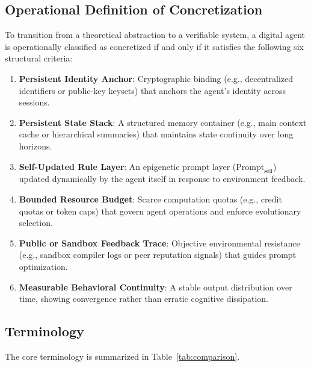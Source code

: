 \documentclass[10pt,journal,compsoc]{IEEEtran}
\begin{document}
\subsection{Operational Definition of Concretization}
To transition from a theoretical abstraction to a verifiable system, a digital agent is operationally classified as concretized if and only if it satisfies the following six structural criteria:
\begin{enumerate}
    \item \textbf{Persistent Identity Anchor}: Cryptographic binding (e.g., decentralized identifiers or public-key keysets) that anchors the agent's identity across sessions.
    \item \textbf{Persistent State Stack}: A structured memory container (e.g., main context cache or hierarchical summaries) that maintains state continuity over long horizons.
    \item \textbf{Self-Updated Rule Layer}: An epigenetic prompt layer ($\text{Prompt}_{\text{self}}$) updated dynamically by the agent itself in response to environment feedback.
    \item \textbf{Bounded Resource Budget}: Scarce computation quotas (e.g., credit quotas or token caps) that govern agent operations and enforce evolutionary selection.
    \item \textbf{Public or Sandbox Feedback Trace}: Objective environmental resistance (e.g., sandbox compiler logs or peer reputation signals) that guides prompt optimization.
    \item \textbf{Measurable Behavioral Continuity}: A stable output distribution over time, showing convergence rather than erratic cognitive dissipation.
\end{enumerate}

\subsection{Terminology}
The core terminology is summarized in Table~\ref{tab:comparison}.
\end{document}
